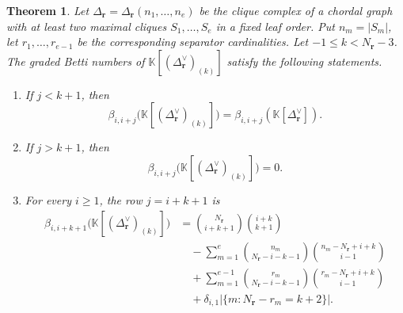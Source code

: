 \documentclass[11pt]{amsart}
\newtheorem{theorem}{Theorem}[section]
\theoremstyle{definition}
\theoremstyle{remark}
\newcommand{\K}{\mathbb K}
\newcommand{\SR}[1]{\K[#1]}
\begin{document}
	\begin{theorem}\label{thm:5}
		Let $\Delta_{\mathbf r}=\Delta_{\mathbf r}(n_1,\ldots,n_e)$ be the clique complex of a chordal graph with at least two maximal cliques $S_1,\ldots,S_e$ in a fixed leaf order. Put $n_m=|S_m|$, let $r_1,\ldots,r_{e-1}$ be the corresponding separator cardinalities.
		Let $-1\le k<N_{\mathbf r}-3$. The graded Betti numbers of $\SR{(\Delta_{\mathbf r}^\vee)_{(k)}}$ satisfy the following statements.
		\begin{enumerate}
			\item[(i)] If $j<k+1$, then
			\[
			\beta_{i,i+j}\bigl(\SR{(\Delta_{\mathbf r}^\vee)_{(k)}}\bigr)
			=
			\beta_{i,i+j}(\SR{\Delta_{\mathbf r}^\vee}).
			\]
			\item[(ii)] If $j>k+1$, then
			\[
			\beta_{i,i+j}\bigl(\SR{(\Delta_{\mathbf r}^\vee)_{(k)}}\bigr)=0.
			\]
			\item[(iii)] For every $i\ge1$, the row $j=i+k+1$ is
			\begin{align*}
				\beta_{i,i+k+1}\bigl(\SR{(\Delta_{\mathbf r}^\vee)_{(k)}}\bigr)
				&=
				\binom{N_{\mathbf r}}{i+k+1}\binom{i+k}{k+1}\\
				&\quad-
				\sum_{m=1}^e
				\binom{n_m}{N_{\mathbf r}-i-k-1}
				\binom{n_m-N_{\mathbf r}+i+k}{i-1}\\
				&\quad+
				\sum_{m=1}^{e-1}
				\binom{r_m}{N_{\mathbf r}-i-k-1}
				\binom{r_m-N_{\mathbf r}+i+k}{i-1}\\
				&\quad+
				\delta_{i,1}\bigl|\{m:N_{\mathbf r}-r_m=k+2\}\bigr|.
			\end{align*}
		\end{enumerate}
	\end{theorem}
	
\end{document}

